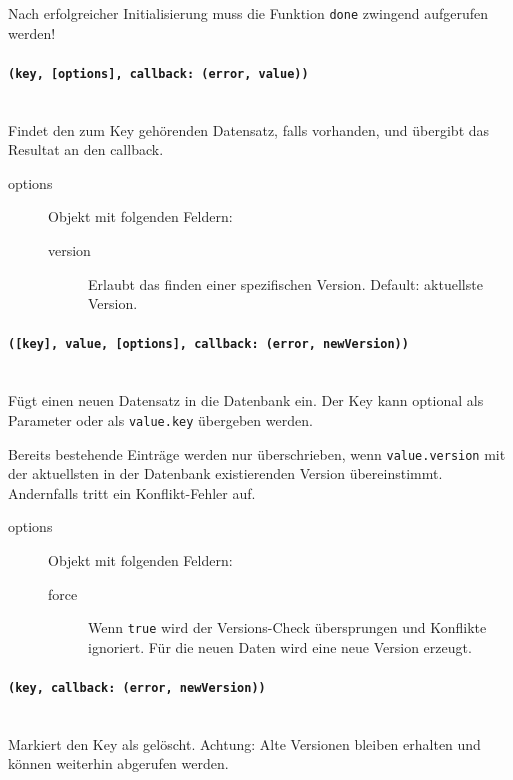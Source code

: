 Nach erfolgreicher Initialisierung muss die Funktion \texttt{done} zwingend aufgerufen werden!


\paragraph{\texttt{(key, [options], callback: (error, value))}} ~\\
Findet den zum Key gehörenden Datensatz, falls vorhanden, und übergibt das Resultat an den callback.
\begin{description}
\item[options] Objekt mit folgenden Feldern:
\begin{description}
\item[version] Erlaubt das finden einer spezifischen Version. Default: aktuellste Version.
\end{description}
\end{description}

\paragraph{\texttt{([key], value, [options], callback: (error, newVersion))}} ~\\
Fügt einen neuen Datensatz in die Datenbank ein. Der Key kann optional als Parameter oder als \texttt{value.key} übergeben werden.

Bereits bestehende Einträge werden nur überschrieben, wenn \texttt{value.version} mit der aktuellsten in der Datenbank existierenden Version übereinstimmt. Andernfalls tritt ein Konflikt-Fehler auf.

\begin{description}
\item[options] Objekt mit folgenden Feldern:
    \begin{description}
    \item[force] Wenn \texttt{true} wird der Versions-Check übersprungen und Konflikte ignoriert. Für die neuen Daten wird eine neue Version erzeugt.
    \end{description}
\end{description}


\paragraph{\texttt{(key, callback: (error, newVersion))}} ~\\
Markiert den Key als gelöscht. Achtung: Alte Versionen bleiben erhalten und können weiterhin abgerufen werden.

